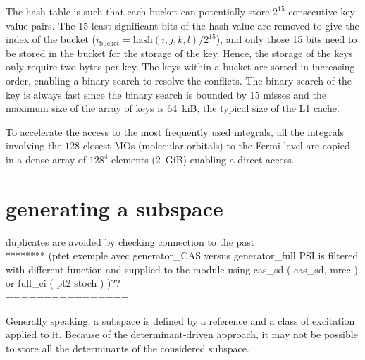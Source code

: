 \documentclass[./thesis.tex]{subfiles}
\begin{document}
The hash table is such that each bucket can potentially store $2^{15}$
consecutive key-value pairs. The 15 least significant bits of the hash value
are removed to give the index of the bucket ($i_\text{bucket} =
\text{hash}(i,j,k,l)/2^{15}$), and only those 15 bits need to be
stored in the bucket for the storage of the key.
Hence, the storage of the keys only require two bytes per key.
The keys within a bucket are sorted in increasing order, enabling a binary
search to resolve the conflicts. The binary search of the key is always fast
since the binary search is bounded by 15 misses and the maximum size of the
array of keys is 64~kiB, the typical size of the L1 cache.

To accelerate the access to the most frequently used integrals, all the
integrals involving the $128$ closest MOs (molecular orbitals) to the Fermi
level are copied in a dense array of $128^4$ elements ($2$~GiB) enabling a
direct access.



% 



\section{generating a subspace}
duplicates are avoided by checking connection to the past \\
******** (ptet exemple avec generator\_CAS versus generator\_full PSI is filtered with different function and supplied to the module using cas\_sd ( cas\_sd, mrcc ) or full\_ci ( pt2 stoch ) )?? \\
================

Generally speaking, a subspace is defined by a reference and a class of excitation applied to it. Because of the determinant-driven approach, it may not be possible to store all the determinants of the considered subspace. 
\end{document}
